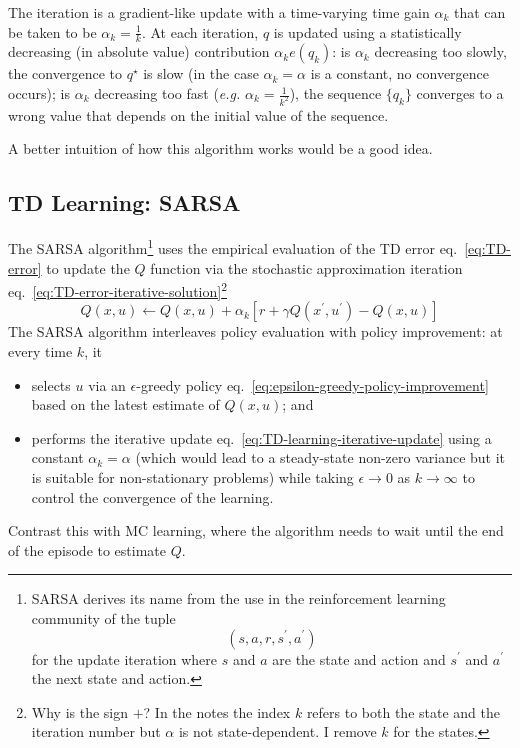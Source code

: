 The iteration is a gradient-like update with a time-varying time gain $\alpha_k$ that can be taken to be $\alpha_k = \frac{1}{k}$. At each iteration, $q$ is updated using a statistically decreasing (in absolute value) contribution $\alpha_k e(q_k)$: is $\alpha_k$ decreasing too slowly, the convergence to $q^\star$ is slow (in the case $\alpha_k=\alpha$ is a constant, no convergence occurs); is $\alpha_k$ decreasing too fast (\textit{e.g.} $\alpha_k=\tfrac{1}{k^2}$), the sequence $\{q_k\}$ converges to a wrong value that depends on the initial value of the sequence.

A better intuition of how this algorithm works would be a good idea.


\subsection{TD Learning: SARSA}
\label{sec:TD-learning-sarsa}

The SARSA algorithm\footnote{SARSA derives its name from the use in the reinforcement learning community of the tuple
  \begin{equation*}
    (s,a,r,s^\prime,a^\prime)
  \end{equation*}
  for the update iteration where $s$ and $a$ are the state and action and $s^\prime$ and $a^\prime$ the next state and action.} uses the empirical evaluation of the TD error eq.~\eqref{eq:TD-error} to update the $Q$ function via the stochastic approximation iteration eq.~\eqref{eq:TD-error-iterative-solution}\footnote{Why is the sign $+$? In the notes the index $k$ refers to both the state and the iteration number but $\alpha$ is not state-dependent. I remove $k$ for the states.}
\begin{equation}
  \label{eq:TD-learning-iterative-update}
  Q(x,u) \leftarrow Q(x,u) + \alpha_k\left[r + \gamma Q(x^\prime,u^\prime) - Q(x,u)\right]
\end{equation}
The SARSA algorithm interleaves policy evaluation with policy improvement: at every time $k$, it
\begin{itemize}
\item selects $u$ via an $\epsilon$-greedy policy eq.~\eqref{eq:epsilon-greedy-policy-improvement} based on the latest estimate of $Q(x,u)$; and
\item performs the iterative update eq.~\eqref{eq:TD-learning-iterative-update} using a constant $\alpha_k = \alpha$ (which would lead to a steady-state non-zero variance but it is suitable for non-stationary problems) while taking $\epsilon\rightarrow 0$ as $k\rightarrow \infty$ to control the convergence of the learning.
\end{itemize}
Contrast this with MC learning, where the algorithm needs to wait until the end of the episode to estimate $Q$.

